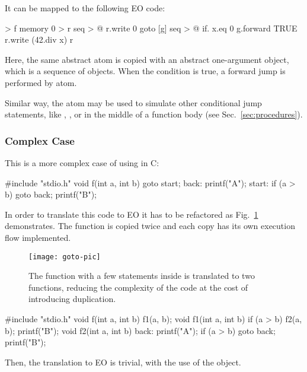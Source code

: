 \documentclass[sigplan,11pt,nonacm,natbib=false]{acmart}
\begin{document}
It can be mapped to the following EO code:

\begin{ffcode}
[x] > f
  memory 0 > r
  seq > @
    r.write 0
    goto
      [g]
        seq > @
          if.
            x.eq 0
            g.forward
            TRUE
          r.write (42.div x)
    r
\end{ffcode}

Here, the same abstract atom  is copied with an abstract one-argument object, which is a sequence of objects. When the condition is true, a forward jump is performed by  atom.

Similar way, the atom  may be used to simulate other conditional jump statements, like , , or  in the middle of a function body (see Sec.~\ref{sec:procedures}).

\subsubsection{Complex Case}

This is a more complex case of using  in C:

\begin{ffcode}
#include "stdio.h"
void f(int a, int b) {
  goto start;
back:
  printf("A");
start:
  if (a > b) goto back;
  printf("B");
}
\end{ffcode}

In order to translate this code to EO it has to be refactored as Fig.~\ref{fig:goto} demonstrates. The function  is copied twice and each copy has its own execution flow implemented.

\begin{figure}
\texttt{[image: goto-pic]}
\caption{The function  with a few  statements inside is translated to two functions, reducing the complexity of the code at the cost of introducing duplication.}
\label{fig:goto}
\end{figure}

\begin{ffcode}
#include "stdio.h"
void f(int a, int b) { f1(a, b); }
void f1(int a, int b) {
  if (a > b) f2(a, b);
  printf("B");
}
void f2(int a, int b) {
back:
  printf("A");
  if (a > b) goto back;
  printf("B");
}
\end{ffcode}

Then, the translation to EO is trivial, with the use of the  object.
\end{document}
